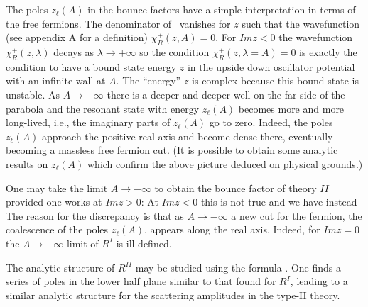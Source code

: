 The poles $z_\ell(A)$ in the bounce factors
have a simple interpretation
in terms of the free fermions. The denominator of \bncwa\ 
vanishes for $z$ such that the wavefunction
(see appendix A for a definition) $\chi_R^+(z,A)=0$. 
For 
$Im z<0$ the wavefunction $\chi_R^+(z,\lambda)$ decays as
$\lambda\to +\infty$ so the condition $\chi_R^+(z,\lambda=A)=0$
is exactly the condition to have a bound state energy 
$z$ in the upside down oscillator potential with an 
infinite wall at $A$. The ``energy'' $z$ is complex 
because this bound state is unstable. 
As $A\to -\infty$ there is a deeper
and deeper well on the far side of the parabola and 
the resonant state with energy $z_\ell(A)$ becomes more 
and more long-lived, i.e., the imaginary parts of $z_\ell(A)$ 
go to zero. Indeed, the poles $z_\ell(A)$ approach the 
positive real axis and become dense there, eventually becoming
a massless free fermion cut. 
(It is possible to obtain some analytic results on $z_\ell(A)$ 
which confirm the above picture deduced on physical grounds.)
 
 
One may take the limit $A\to -\infty$ to obtain the bounce factor 
of theory $II$ provided one works at $Im z>0$:
\eqn{}
At $Im z<0$ this is not true and we have instead
\eqn{} 
The reason for the discrepancy is that as $A\to-\infty$ a new cut 
for the fermion, the coalescence of the poles 
$z_\ell(A)$, appears along the real axis. Indeed, for 
$Im z=0$ the $A\to -\infty$ limit of $R^I$ is ill-defined.
 
The analytic structure of $R^{II}$ may be studied using the formula \gmfrm.
One finds a series of poles in the lower half plane similar to that found
for $R^I$, leading to a similar analytic structure for the scattering
amplitudes in the type-II theory.
 
 
 
